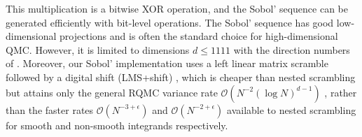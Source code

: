 This multiplication is a bitwise XOR operation, and the Sobol' sequence can be generated efficiently with bit-level operations. The Sobol' sequence has good low-dimensional projections and is often the standard choice for high-dimensional QMC. However, it is limited to dimensions $d \leq 1111$ with the direction numbers of \citet{joekuo2008sobol}. Moreover, our Sobol' implementation uses a left linear matrix scramble followed by a digital shift (LMS+shift) \citep{matousek1998l2discrepancy}, which is cheaper than nested scrambling but attains only the general RQMC variance rate $\mathcal{O}(N^{-2} (\log N)^{d-1})$ \citep{owen1997scrambling}, rather than the faster rates $\mathcal{O}(N^{-3+\epsilon})$ and $\mathcal{O}(N^{-2+\epsilon})$ available to nested scrambling for smooth and non-smooth integrands respectively. 




